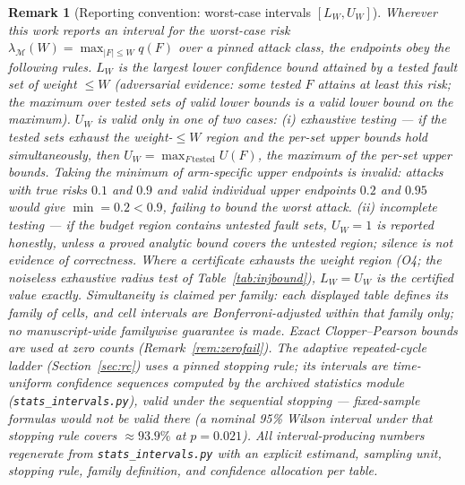 \documentclass[11pt,a4paper]{article}
\newtheorem{remark}{Remark}
\begin{document}
\begin{remark}[{Reporting convention: worst-case intervals $[L_W,U_W]$}]
\label{rem:intervals}
Wherever this work reports an interval for the worst-case risk
$\lambda_{\mathcal{M}}(W)=\max_{|F|\le W}q(F)$ over a pinned attack
class, the endpoints obey the following rules.
$L_W$ is the largest lower confidence bound attained by a \emph{tested}
fault set of weight $\le W$ (adversarial evidence: some tested $F$
attains at least this risk; the maximum over tested sets of valid lower
bounds is a valid lower bound on the maximum).
$U_W$ is valid only in one of two cases: \emph{(i) exhaustive testing}
--- if the tested sets exhaust the weight-$\le W$ region and the
per-set upper bounds hold simultaneously, then
$U_W=\max_{F\,\mathrm{tested}}U(F)$, the \emph{maximum} of the per-set
upper bounds. Taking the minimum of arm-specific upper endpoints is
invalid: attacks with true risks $0.1$ and $0.9$ and valid individual
upper endpoints $0.2$ and $0.95$ would give $\min=0.2<0.9$, failing to
bound the worst attack. \emph{(ii) incomplete testing} --- if the
budget region contains untested fault sets, $U_W=1$ is reported
honestly, unless a proved analytic bound covers the untested region;
silence is not evidence of correctness. Where a certificate exhausts
the weight region (O4; the noiseless exhaustive radius test of
Table~\ref{tab:injbound}), $L_W=U_W$ is the certified value exactly.
Simultaneity is claimed \emph{per family}: each displayed table defines
its family of cells, and cell intervals are Bonferroni-adjusted within
that family only; no manuscript-wide familywise guarantee is made.
Exact Clopper--Pearson bounds are used at zero counts
(Remark~\ref{rem:zerofail}). The adaptive repeated-cycle ladder
(Section~\ref{sec:rc}) uses a pinned stopping rule; its intervals are
time-uniform confidence sequences \cite{howard2021confidence} computed
by the archived statistics module (\texttt{stats\_intervals.py}),
valid under the sequential stopping --- fixed-sample formulas would not
be valid there (a nominal 95\% Wilson interval under that stopping rule
covers $\approx\!93.9\%$ at $p=0.021$).
All interval-producing numbers regenerate from
\texttt{stats\_intervals.py} with an explicit estimand, sampling unit,
stopping rule, family definition, and confidence allocation per table.
\end{remark}
\end{document}
